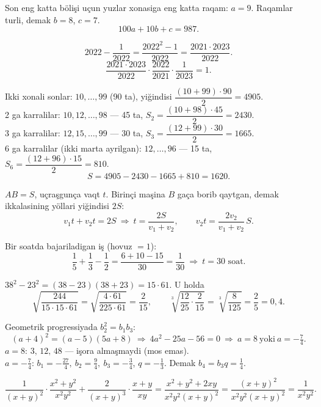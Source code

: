 




Son eng katta bölişi uçun yuzlar xonasiga eng katta raqam: $a=9$. Raqamlar turli, demak $b=8$, $c=7$.
\[100a+10b+c=987.\]

\[2022-\frac1{2022}=\frac{2022^2-1}{2022}=\frac{2021\cdot2023}{2022}.\]
\[\frac{2021\cdot2023}{2022}\cdot\frac{2022}{2021}\cdot\frac1{2023}=1.\]

Ikki xonali sonlar: $10,\dots,99$ (90 ta), yiğindisi $\dfrac{(10+99)\cdot 90}{2}=4905$.\\
2 ga karralilar: $10,12,\dots,98$ — 45 ta, $S_2=\dfrac{(10+98)\cdot45}{2}=2430$.\\
3 ga karralilar: $12,15,\dots,99$ — 30 ta, $S_3=\dfrac{(12+99)\cdot30}{2}=1665$.\\
6 ga karralilar (ikki marta ayrilgan): $12,\dots,96$ — 15 ta, $S_6=\dfrac{(12+96)\cdot15}{2}=810$.
\[S=4905-2430-1665+810=1620.\]

$AB=S$, uçraşgunça vaqt $t$. Birinçi maşina $B$ gaça borib qaytgan, demak ikkalasining yöllari yiğindisi $2S$:
\[v_1t+v_2t=2S\ \Rightarrow\ t=\frac{2S}{v_1+v_2},\qquad v_2t=\frac{2v_2}{v_1+v_2}\,S.\]

Bir soatda bajariladigan iş (hovuz $=1$):
\[\frac15+\frac13-\frac12=\frac{6+10-15}{30}=\frac1{30}\ \Rightarrow\ t=30 \text{ soat}.\]

$38^2-23^2=(38-23)(38+23)=15\cdot61$. U holda
\[\sqrt{\frac{244}{15\cdot15\cdot61}}=\sqrt{\frac{4\cdot61}{225\cdot61}}=\frac{2}{15},\qquad
\sqrt[3]{\frac{12}{25}\cdot\frac{2}{15}}=\sqrt[3]{\frac{8}{125}}=\frac25=0{,}4.\]

Geometrik progressiyada $b_2^2=b_1b_3$:
\[(a+4)^2=(a-5)(5a+8)\ \Rightarrow\ 4a^2-25a-56=0\ \Rightarrow\ a=8\ \text{yoki}\ a=-\tfrac74.\]
$a=8$: $3,\,12,\,48$ — işora almaşmaydi (mos emas).\\
$a=-\frac74$: $b_1=-\frac{27}4,\ b_2=\frac94,\ b_3=-\frac34$, $q=-\frac13$. Demak $b_4=b_3q=\frac14$.

\[\frac{1}{(x+y)^2}\cdot\frac{x^2+y^2}{x^2y^2}+\frac{2}{(x+y)^3}\cdot\frac{x+y}{xy}
=\frac{x^2+y^2+2xy}{x^2y^2(x+y)^2}=\frac{(x+y)^2}{x^2y^2(x+y)^2}=\frac1{x^2y^2}.\]

